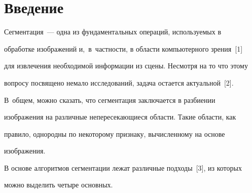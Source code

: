   


  







 \thispagestyle{headings}

 

 \vspace*{-12pt}

  

\section{Введение}



  Сегментация~---  одна из фундаментальных операций, используемых в 

обработке изображений и,~в~частности, в области компьютерного зрения~[1] 

для извлечения необходимой информации из сцены. Несмотря на то что этому 

вопросу посвящено немало исследований, задача остается актуальной~[2]. 

В~общем, можно сказать, что сегментация заключается в разбиении 

изображения на различные непересекающиеся области. Такие области, как 

правило, однородны по некоторому признаку, вычисленному на основе 

изображения.

  

  В основе алгоритмов сегментации лежат различные подходы~[3], из которых 

можно выделить четыре основных.

